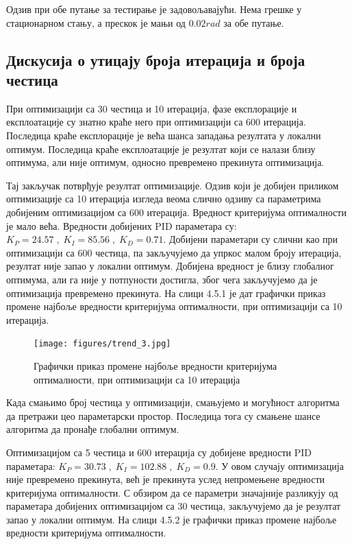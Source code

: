 \documentclass[12pt]{article}
\begin{document}
Одзив при обе путање за тестирање је задовољавајући. Нема грешке у стационарном стању, а прескок је мањи од $0.02 rad$ за обе путање.


\subsection{Дискусија о утицају броја итерација и броја честица}
При оптимизацији са 30 честица и 10 итерација, фазе експлорације и експлоатације су знатно краће него при оптимизацији са 600 итерација. Последица краће експлорације је већа шанса западања резултата у локални оптимум. Последица краће експлоатације је резултат који се налази близу оптимума, али није оптимум, односно превремено прекинута оптимизација.

Тај закључак потврђује резултат оптимизације. Одзив који је добијен приликом оптимизације са 10 итерација изгледа веома слично одзиву са параметрима добијеним оптимизацијом са 600 итерација. Вредност критеријума оптималности је мало већа. Вредности добијених PID параметара су: $K_P=24.57\;,\;K_I=85.56\;,\;K_D=0.71$. Добијени параметари су слични као при оптимизацији са 600 честица, па закључујемо да упркос малом броју итерација, резултат није запао у локални оптимум. Добијена вредност је близу глобалног оптимума, али га није у потпуности достигла, због чега закључујемо да је оптимизација превремено прекинута. На слици 4.5.1 је дат графички приказ промене најбоље вредности критеријума оптималности, при оптимизацији са 10 итерација.

\begin{figure}[H]
    \centering
    \texttt{[image: figures/trend\_3.jpg]}
    \caption{Графички приказ промене најбоље вредности критеријума оптималности, при оптимизацији са 10 итерација}
    \label{fig:trend_3}
\end{figure}

Када смањимо број честица у оптимизацији, смањујемо и могућност алгоритма да претражи цео параметарски простор. Последица тога су смањене шансе алгоритма да пронађе глобални оптимум.

Оптимизацијом са 5 честица и 600 итерација су добијене вредности PID параметара: $K_P=30.73\;,\;K_I=102.88\;,\;K_D=0.9$. У овом случају оптимизација није превремено прекинута, већ је прекинута услед непромењене вредности критеријума оптималности. С обзиром да се параметри значајније разликују од параметара добијених оптимизацијом са 30 честица, закључујемо да је резултат запао у локални оптимум. На слици 4.5.2 је графички приказ промене најбоље вредности критеријума оптималности.
\end{document}
